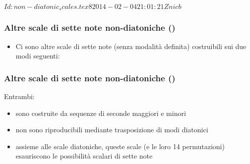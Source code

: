 %
%
\svnInfo $Id: non-diatonic_scales.tex 8 2014-02-04 21:01:21Z nicb $

\setcounter{ms}{0}
\begin{frame}
    \frametitle{Altre scale di sette note non-diatoniche ()}

    \begin{itemize}
        \item Ci sono altre scale di sette note (senza modalit\`a definita)
            costruibili sui due modi seguenti:

            \begin{center}
            \end{center}

    \end{itemize}
\end{frame}

\begin{frame}
    \frametitle{Altre scale di sette note non-diatoniche ()}

    Entrambi:

    \begin{itemize}
        \item sono costruite da sequenze di seconde maggiori e minori
        \item non sono riproducibili mediante trasposizione di modi diatonici
        \item assieme alle scale diatoniche, queste scale (e le loro 14 permutazioni)
            esauriscono le possibilit\`a scalari di sette note

    \end{itemize}

\end{frame}
